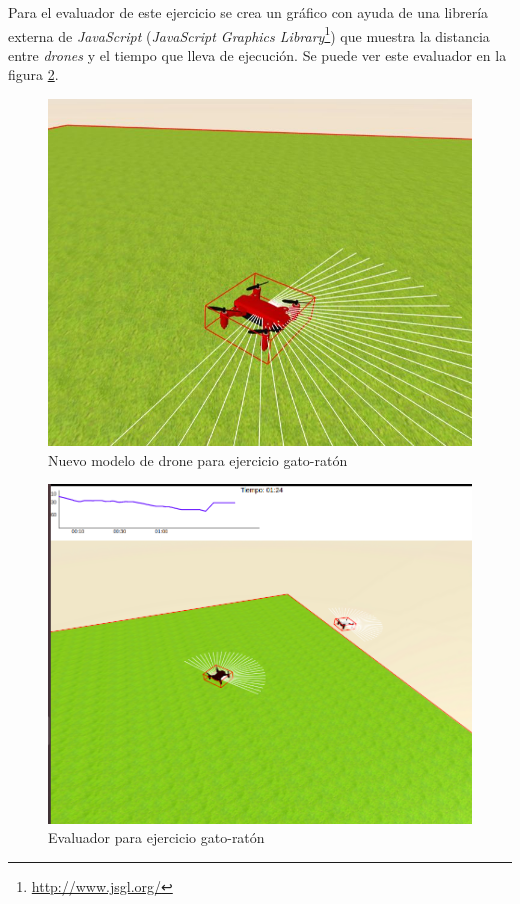 Para el evaluador de este ejercicio se crea un gráfico con ayuda de una librería externa de \textit{JavaScript} (\textit{JavaScript Graphics Library}\footnote{\url{http://www.jsgl.org/}}) que muestra la distancia entre \textit{drones} y el tiempo que lleva de ejecución. Se puede ver este evaluador en la figura \ref{fig:evaluador_gato_raton}.
  
    \begin{figure}[h]
    \centering           
    \includegraphics[scale=0.5]{img/red_drone.jpg}
    \caption{Nuevo modelo de drone para ejercicio gato-ratón}
    \label{fig:drone_rojo}
    
\end{figure}
\begin{figure}[h]
\centering           
\includegraphics[scale=0.3]{img/evaluador_drone.png}
\caption{Evaluador para ejercicio gato-ratón}
\label{fig:evaluador_gato_raton}
\end{figure}
